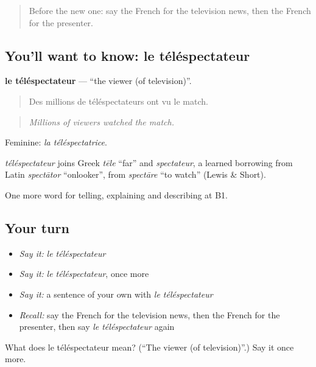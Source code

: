 \begin{quote}
Before the new one: say the French for the television news, then the French for the presenter.
\end{quote}

\subsection*{You'll want to know: le téléspectateur}
\textbf{le téléspectateur} — \textquotedblleft{}the viewer (of television)\textquotedblright{}.

\begin{quote}
Des millions de téléspectateurs ont vu le match.
\end{quote}

\begin{quote}
\emph{Millions of viewers watched the match.}
\end{quote}

Feminine: \emph{la téléspectatrice}.

\begin{cousinweb}
\emph{téléspectateur} joins Greek \emph{tēle} \textquotedblleft{}far\textquotedblright{} and \emph{spectateur}, a learned borrowing from Latin \emph{spectātor} \textquotedblleft{}onlooker\textquotedblright{}, from \emph{spectāre} \textquotedblleft{}to watch\textquotedblright{} (Lewis \& Short).
\end{cousinweb}

\begin{grammarlens}[title={What you've built}]
One more word for telling, explaining and describing at B1.
\end{grammarlens}

\subsection*{Your turn}
\begin{itemize}
\raggedright
  \item \emph{Say it:} \emph{le téléspectateur}
  \item \emph{Say it:} \emph{le téléspectateur}, once more
  \item \emph{Say it:} a sentence of your own with \emph{le téléspectateur}
  \item \emph{Recall:} say the French for the television news, then the French for the presenter, then say \emph{le téléspectateur} again
\end{itemize}

\begin{tcolorbox}[breakable,colback=teal!4,colframe=teal!35!black,title={Before you move on}]
What does le téléspectateur mean? (\textquotedblleft{}The viewer (of television)\textquotedblright{}.) Say it once more.
\end{tcolorbox}
